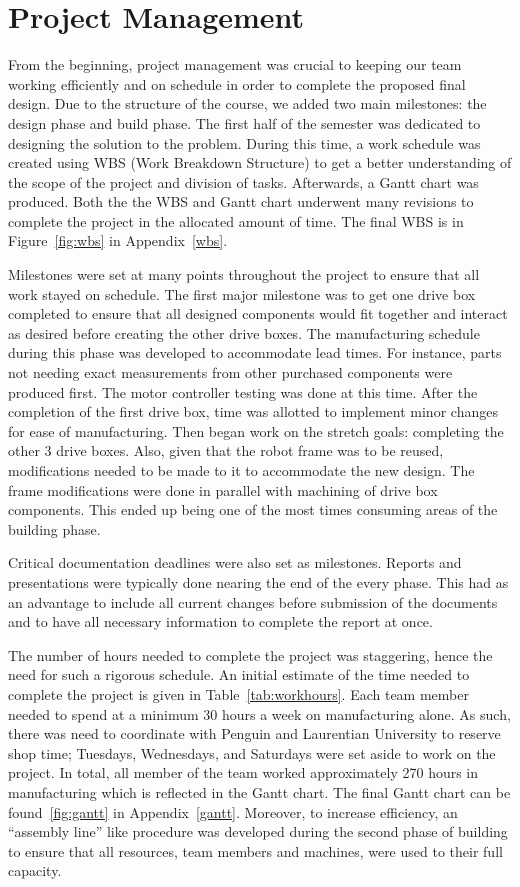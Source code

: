 \section{Project Management}

From the beginning, project management was crucial to keeping our team working efficiently and on schedule in order to complete the proposed final design. Due to the structure of the course, we added two main milestones: the design phase and build phase. The first half of the semester was dedicated to designing the solution to the problem. During this time, a work schedule was created using WBS (Work Breakdown Structure) to get a better understanding of the scope of the project and division of tasks. Afterwards, a Gantt chart was produced. Both the the WBS and Gantt chart underwent many revisions to complete the project in the allocated amount of time. The final WBS is in Figure~\ref{fig:wbs} in Appendix~\ref{wbs}.

Milestones were set at many points throughout the project to ensure that all work stayed on schedule. The first major milestone was to get one drive box completed to ensure that all designed components would fit together and interact as desired before creating the other drive boxes. The manufacturing schedule during this phase was developed to accommodate lead times. For instance, parts not needing exact measurements from other purchased components were produced first. The motor controller testing was done at this time. After the completion of the first drive box, time was allotted to implement minor changes for ease of manufacturing. Then began work on the stretch goals: completing the other 3 drive boxes. Also, given that the robot frame was to be reused, modifications needed to be made to it to accommodate the new design. The frame modifications were done in parallel with machining of drive box components. This ended up being one of the most times consuming areas of the building phase.

Critical documentation deadlines were also set as milestones. Reports and presentations were typically done nearing the end of the every phase. This had as an advantage to include all current changes before submission of the documents and to have all necessary information to complete the report at once. 

The number of hours needed to complete the project was staggering, hence the need for such a rigorous schedule. An initial estimate of the time needed to complete the project is given in Table~\ref{tab:workhours}. Each team member needed to spend at a minimum 30 hours a week on manufacturing alone. As such, there was need to coordinate with Penguin and Laurentian University to reserve shop time; Tuesdays, Wednesdays, and Saturdays were set aside to work on the project. In total, all member of the team worked approximately 270 hours in manufacturing which is reflected in the Gantt chart. The final Gantt chart can be found~\ref{fig:gantt} in Appendix~\ref{gantt}. Moreover, to increase efficiency, an ``assembly line'' like procedure was developed during the second phase of building to ensure that all resources, team members and machines, were used to their full capacity.

